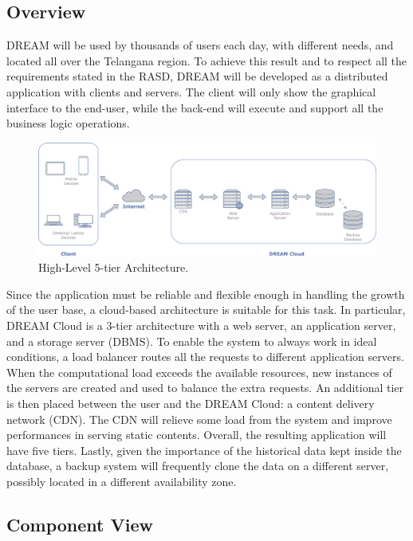 \subsection{Overview}
DREAM will be used by thousands of users each day, with different needs, and located all over the Telangana region. To achieve this result and to respect all the requirements stated in the RASD, DREAM will be developed as a distributed application with clients and servers. The client will only show the graphical interface to the end-user, while the back-end will execute and support all the business logic operations. 
\begin{figure}[hbt!]
\centering
\includegraphics[width=\textwidth]{../images_diagrams/dd/highlevel_arch.png}
\caption{High-Level 5-tier Architecture.}
\label{fig:highLevelArch}
\end{figure}

\noindent
Since the application must be reliable and flexible enough in handling the growth of the user base, a cloud-based architecture is suitable for this task. In particular, DREAM Cloud is a 3-tier architecture with a web server, an application server, and a storage server (DBMS). To enable the system to always work in ideal conditions, a load balancer routes all the requests to different application servers. When the computational load exceeds the available resources, new instances of the servers are created and used to balance the extra requests. An additional tier is then placed between the user and the DREAM Cloud: a content delivery network (CDN). The CDN will relieve some load from the system and improve performances in serving static contents. Overall, the resulting application will have five tiers. Lastly, given the importance of the historical data kept inside the database, a backup system will frequently clone the data on a different server, possibly located in a different availability zone.

\subsection{Component View}

